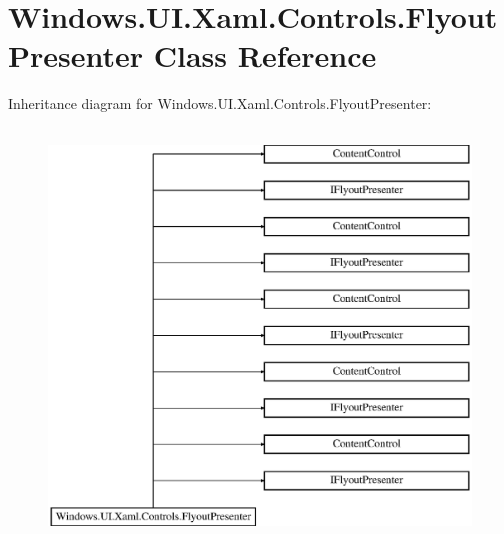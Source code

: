 \hypertarget{class_windows_1_1_u_i_1_1_xaml_1_1_controls_1_1_flyout_presenter}{}\section{Windows.\+U\+I.\+Xaml.\+Controls.\+Flyout\+Presenter Class Reference}
\label{class_windows_1_1_u_i_1_1_xaml_1_1_controls_1_1_flyout_presenter}
Inheritance diagram for Windows.\+U\+I.\+Xaml.\+Controls.\+Flyout\+Presenter\+:\begin{figure}[H]
\begin{center}
\leavevmode
\includegraphics[height=11.000000cm]{class_windows_1_1_u_i_1_1_xaml_1_1_controls_1_1_flyout_presenter}
\end{center}
\end{figure}

